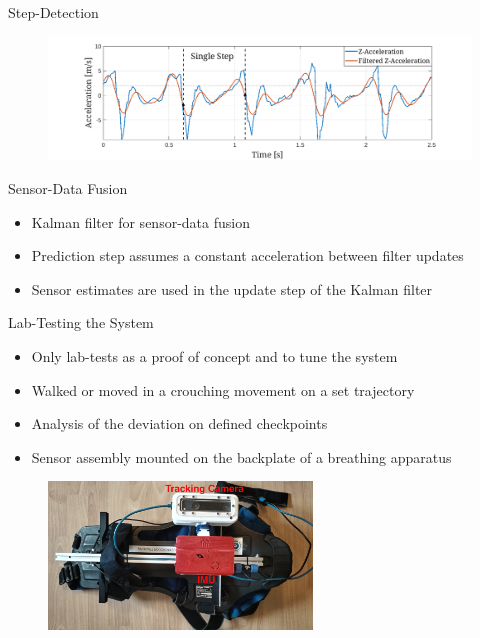 \documentclass[aspectratio=169]{beamer}
\begin{document}
{\begin{frame}{Step-Detection}
		\vspace{0.5cm}
		\begin{figure}
			\centering
			\includegraphics[width=0.9\linewidth]{../Conference_Paper/WalkAcceleration}
		\end{figure}
		
		
		
	\end{frame}
	
	\begin{frame}{Sensor-Data Fusion}
		\begin{itemize}
			\item Kalman filter for sensor-data fusion
			\item Prediction step assumes a constant acceleration between filter updates 
			\item Sensor estimates are used in the update step of the Kalman filter
		\end{itemize}
	\end{frame}
	
	\begin{frame}{Lab-Testing the System}
		\begin{itemize}
			\item Only lab-tests as a proof of concept and to tune the system
			\item Walked or moved in a crouching movement on a set trajectory
			\item Analysis of the deviation on defined checkpoints
			\item Sensor assembly mounted on the backplate of a breathing apparatus
		\end{itemize}
		\begin{figure}
			\centering
			\includegraphics[width=7cm]{../Conference_Paper/Assembly.jpg}
		\end{figure}
		

\end{frame}}
\end{document}
